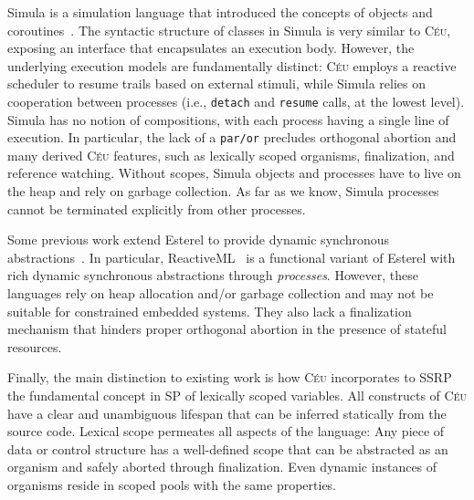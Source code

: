 \documentclass{sigplanconf}
\newcommand{\CEU}{\textsc{C\'{e}u}\xspace}
\newcommand{\code}[1] {{\small{\texttt{#1}}}}
\newcommand{\1}{\;}
\newcommand{\2}{\;\;}
\newcommand{\3}{\;\;\;}
\newcommand{\5}{\;\;\;\;\;}
\begin{document}
Simula is a simulation language that introduced the concepts of objects and 
coroutines~\cite{simula}.
%
The syntactic structure of classes in Simula is very similar to \CEU, exposing 
an interface that encapsulates an execution body.
%
However, the underlying execution models are fundamentally distinct:
\CEU employs a reactive scheduler to resume trails based on external stimuli, 
while Simula relies on cooperation between processes (i.e., \code{detach} and 
\code{resume} calls, at the lowest level).
%
Simula has no notion of compositions, with each process having a single line of 
execution.
In particular, the lack of a \code{par/or} precludes orthogonal abortion and 
many derived \CEU features, such as lexically scoped organisms, finalization, 
and reference watching.
%
Without scopes, Simula objects and processes have to live on the heap and rely 
on garbage collection.
As far as we know, Simula processes cannot be terminated explicitly from other 
processes.
%

Some previous work extend Esterel to provide dynamic synchronous 
abstractions~\cite{rp.scripts,rp.oo,sugarcubes}.
%
In particular, ReactiveML~\cite{rml} is a functional variant of Esterel with 
rich dynamic synchronous abstractions through \emph{processes}.
%
However, these languages rely on heap allocation and/or garbage collection and 
may not be suitable for constrained embedded systems.
%
%
They also lack a finalization mechanism that hinders proper orthogonal abortion 
in the presence of stateful resources.

Finally, the main distinction to existing work is how \CEU incorporates to SSRP 
the fundamental concept in SP of lexically scoped variables.
%
All constructs of \CEU have a clear and unambiguous lifespan that can be 
inferred statically from the source code.
%
Lexical scope permeates all aspects of the language:
Any piece of data or control structure has a well-defined scope that can be 
abstracted as an organism and safely aborted through finalization.
%
Even dynamic instances of organisms reside in scoped pools with the same 
properties.
%
\end{document}
